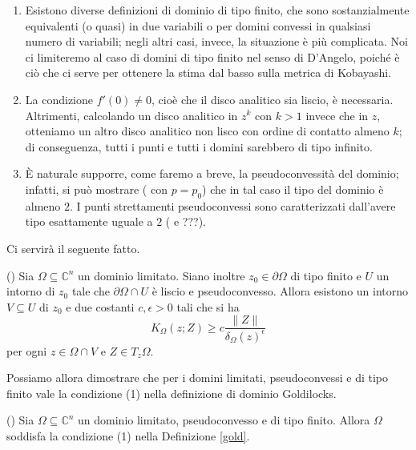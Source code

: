 \begin{oss}
    \begin{enumerate}
        \item Esistono diverse definizioni di dominio di tipo finito, che sono sostanzialmente equivalenti (o quasi) in due variabili o per domini convessi in qualsiasi numero di variabili; negli altri casi, invece, la situazione è più complicata. Noi ci limiteremo al caso di domini di tipo finito nel senso di D'Angelo, poiché è ciò che ci serve per ottenere la stima dal basso sulla metrica di Kobayashi.
        \item La condizione $f'(0)\not=0$, cioè che il disco analitico sia liscio, è necessaria. Altrimenti, calcolando un disco analitico in $z^k$ con $k>1$ invece che in $z$, otteniamo un altro disco analitico non lisco con ordine di contatto almeno $k$; di conseguenza, tutti i punti e tutti i domini sarebbero di tipo infinito.
        \item È naturale supporre, come faremo a breve, la pseudoconvessità del dominio; infatti, si può mostrare (\cite[Corollary 5.6]{D'A} con $p=p_0$) che in tal caso il tipo del dominio è almeno $2$. I punti strettamenti pseudoconvessi sono caratterizzati dall'avere tipo esattamente uguale a $2$ (\cite[Corollary 5.8]{D'A} e ???).
    \end{enumerate}
\end{oss}

Ci servirà il seguente fatto.

\begin{thm} \label{cho}
    (\cite[Theorem 1]{C}) Sia $\Omega\subseteq\mathbb{C}^n$ un dominio limitato. Siano inoltre $z_0\in\partial\Omega$ di tipo finito e $U$ un intorno di $z_0$ tale che $\partial\Omega\cap U$ è liscio e pseudoconvesso. Allora esistono un intorno $V\subseteq U$ di $z_0$ e due costanti $c,\epsilon>0$ tali che si ha
    $$K_\Omega(z;Z) \ge c\frac{\|Z\|}{\delta_\Omega(z)^\epsilon}$$
    per ogni $z\in\Omega\cap V$ e $Z\in T_z\Omega$.
\end{thm}

Possiamo allora dimostrare che per i domini limitati, pseudoconvessi e di tipo finito vale la condizione (1) nella definizione di dominio Goldilocks.

\begin{cor} \label{finito_is_1}
    (\cite[Lemma 2.6]{BZ1}) Sia $\Omega\subseteq\mathbb{C}^n$ un dominio limitato, pseudoconvesso e di tipo finito. Allora $\Omega$ soddisfa la condizione (1) nella Definizione \ref{gold}.
\end{cor}

